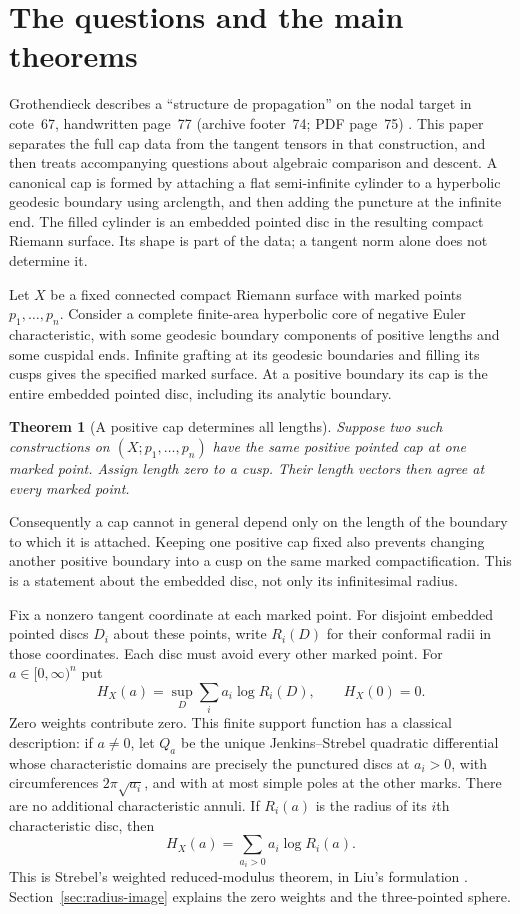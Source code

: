 \documentclass[11pt,a4paper]{article}
\newtheorem{theorem}{Theorem}[section]
\theoremstyle{definition}
\begin{document}
\section{The questions and the main theorems}
Grothendieck describes a ``structure de propagation'' on the nodal target in cote~67, handwritten page~77 (archive footer~74; PDF page~75) \cite{Groth}. This paper separates the full cap data from the tangent tensors in that construction, and then treats accompanying questions about algebraic comparison and descent. A canonical cap is formed by attaching a flat semi-infinite cylinder to a hyperbolic geodesic boundary using arclength, and then adding the puncture at the infinite end. The filled cylinder is an embedded pointed disc in the resulting compact Riemann surface. Its shape is part of the data; a tangent norm alone does not determine it.

Let $X$ be a fixed connected compact Riemann surface with marked points $p_1,\ldots,p_n$. Consider a complete finite-area hyperbolic core of negative Euler characteristic, with some geodesic boundary components of positive lengths and some cuspidal ends. Infinite grafting at its geodesic boundaries and filling its cusps gives the specified marked surface. At a positive boundary its cap is the entire embedded pointed disc, including its analytic boundary.

\begin{theorem}[A positive cap determines all lengths]\label{thm:single-cap}
Suppose two such constructions on $(X;p_1,\ldots,p_n)$ have the same positive pointed cap at one marked point. Assign length zero to a cusp. Their length vectors then agree at every marked point.
\end{theorem}

Consequently a cap cannot in general depend only on the length of the boundary to which it is attached. Keeping one positive cap fixed also prevents changing another positive boundary into a cusp on the same marked compactification. This is a statement about the embedded disc, not only its infinitesimal radius.


Fix a nonzero tangent coordinate at each marked point. For disjoint embedded pointed discs $D_i$ about these points, write $R_i(D)$ for their conformal radii in those coordinates. Each disc must avoid every other marked point. For $a\in[0,\infty)^n$ put
\[
 H_X(a)=\sup_D\sum_i a_i\log R_i(D),\qquad H_X(0)=0.
\]
Zero weights contribute zero. This finite support function has a classical description: if $a\ne0$, let $Q_a$ be the unique Jenkins--Strebel quadratic differential whose characteristic domains are precisely the punctured discs at $a_i>0$, with circumferences $2\pi\sqrt{a_i}$, and with at most simple poles at the other marks. There are no additional characteristic annuli. If $R_i(a)$ is the radius of its $i$th characteristic disc, then
\[
                 H_X(a)=\sum_{a_i>0}a_i\log R_i(a).
\]
This is Strebel's weighted reduced-modulus theorem, in Liu's formulation \cite[Lemma~1.2, p.~215; Lemma~1.7, pp.~218--219; Theorem~3.4, p.~226]{Liu}. Section~\ref{sec:radius-image} explains the zero weights and the three-pointed sphere.
\end{document}
